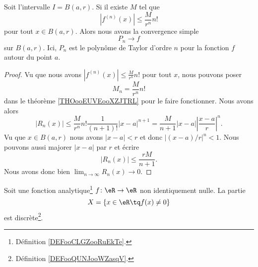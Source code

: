 \begin{proposition}
	Soit l'intervalle \( I=B(a,r)\). Si il existe \( M\) tel que
	\begin{equation}
		| f^{(n)}(x) |\leq \frac{ M }{ r^n }n!
	\end{equation}
	pour tout \( x\in B(a,r)\). Alors nous avons la convergence simple
	\begin{equation}
		P_n\to f
	\end{equation}
	sur \( B(a,r)\). Ici, \( P_n\) est le polynôme de Taylor d'ordre \( n\) pour la fonction \( f\) autour du point \( a\).
\end{proposition}

\begin{proof}
	Vu que nous avons \( | f^{(n)}(x) |\leq \frac{ M }{ r^n }n!\) pour tout \( x\), nous pouvons poser
	\begin{equation}
		M_n=\frac{ M }{ r^n }n!
	\end{equation}
	dans le théorème \ref{THOooEUVEooXZJTRL} pour le faire fonctionner. Nous avons alors
	\begin{equation}
		| R_n(x) |\leq \frac{ M }{ r^n }n!\frac{1}{ (n+1)! }| x-a |^{n+1}=\frac{ M }{ n+1 }| x-a |\left| \frac{ x-a }{ r } \right|^n.
	\end{equation}
	Vu que \( x\in B(a,r)\) nous avons \( | x-a |<r\) et donc \( |(x-a)/r |^n<1\). Nous pouvons aussi majorer \( | x-a |\) par \( r\) et écrire
	\begin{equation}
		| R_n(x) |\leq \frac{ rM }{ n+1 }.
	\end{equation}
	Nous avons donc bien \( \lim_{n\to \infty} R_n(x)\to 0\).
\end{proof}


\begin{theorem}	\label{THOooEAYXooTvVYXN}
	Soit une fonction analytique\footnote{Définition \ref{DEFooCLGZooRuEkTe}.} \(f \colon \eR\to \eR  \) non identiquement nulle. La partie
	\begin{equation}
		X=\{ x\in \eR\tq f(x)\neq 0 \}
	\end{equation}
	est discrète\footnote{Définition \ref{DEFooQUNJooWZasqV}.}.
\end{theorem}

